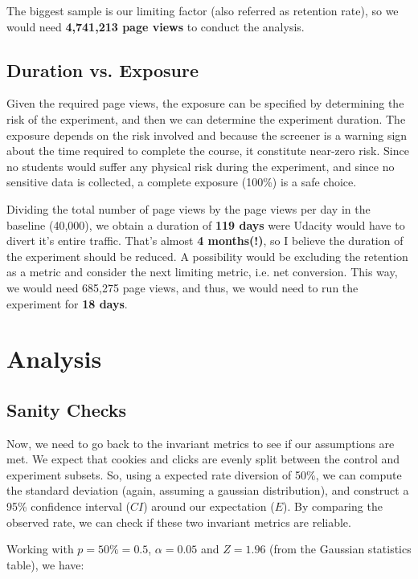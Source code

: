 \documentclass[11pt]{article}
\begin{document}
		The biggest sample is our limiting factor (also referred as retention rate), so we would need \textbf{4,741,213 page views} to conduct the analysis.
		
	\subsection{Duration vs. Exposure}
	
		Given the required page views, the exposure can be specified by determining the risk of the experiment, and then we can determine the experiment duration.
		The exposure depends on the risk involved and because the screener is a warning sign about the time required to complete the course, it constitute near-zero risk.
		Since no students would suffer any physical risk during the experiment, and since no sensitive data is collected, a complete exposure (100\%) is a safe choice.
		
		Dividing the total number of page views by the page views per day in the baseline (40,000), we obtain a duration of \textbf{119 days} were Udacity would have to divert it's entire traffic.
		That's almost \textbf{4 months(!)}, so I believe the duration of the experiment should be reduced.
		A possibility would be excluding the retention as a metric and consider the next limiting metric, i.e. net conversion.
		This way, we would need 685,275 page views, and thus, we would need to run the experiment for \textbf{18 days}.	
	
\section{Analysis} \label{sec:analysis}

	\subsection{Sanity Checks}
	
		Now, we need to go back to the invariant metrics to see if our assumptions are met.
		We expect that cookies and clicks are evenly split between the control and experiment subsets.
		So, using a expected rate diversion of 50\%, we can compute the standard deviation (again, assuming a gaussian distribution), and construct a 95\% confidence interval ($CI$) around our expectation ($E$). 
		By comparing the observed rate, we can check if these two invariant metrics are reliable.
		
		Working with $p= 50\% = 0.5$, $\alpha = 0.05$ and $Z=1.96$ (from the Gaussian statistics table), we have:
		
\end{document}
